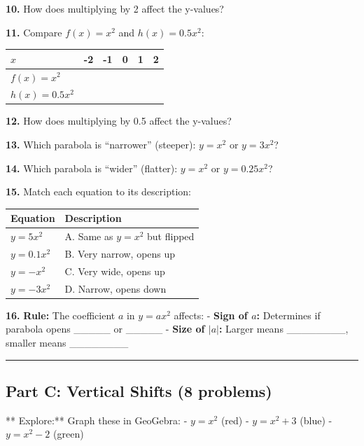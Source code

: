 \documentclass[
  11pt,
]{article}
\begin{document}
\textbf{10.} How does multiplying by 2 affect the y-values?

\textbf{11.} Compare \(f(x) = x^2\) and \(h(x) = 0.5x^2\):

\begin{longtable}[]{@{}llllll@{}}
\toprule\noalign{}
\(x\) & -2 & -1 & 0 & 1 & 2 \\
\midrule\noalign{}
\endhead
\bottomrule\noalign{}
\endlastfoot
\(f(x) = x^2\) & & & & & \\
\(h(x) = 0.5x^2\) & & & & & \\
\end{longtable}

\textbf{12.} How does multiplying by 0.5 affect the y-values?

\textbf{13.} Which parabola is ``narrower'' (steeper): \(y = x^2\) or
\(y = 3x^2\)?

\textbf{14.} Which parabola is ``wider'' (flatter): \(y = x^2\) or
\(y = 0.25x^2\)?

\textbf{15.} Match each equation to its description:

\begin{longtable}[]{@{}ll@{}}
\toprule\noalign{}
Equation & Description \\
\midrule\noalign{}
\endhead
\bottomrule\noalign{}
\endlastfoot
\(y = 5x^2\) & A. Same as \(y = x^2\) but flipped \\
\(y = 0.1x^2\) & B. Very narrow, opens up \\
\(y = -x^2\) & C. Very wide, opens up \\
\(y = -3x^2\) & D. Narrow, opens down \\
\end{longtable}

\textbf{16.} \textbf{Rule:} The coefficient \(a\) in \(y = ax^2\)
affects: - \textbf{Sign of \(a\):} Determines if parabola opens
\_\_\_\_\_ or \_\_\_\_\_ - \textbf{Size of \(|a|\):} Larger means
\_\_\_\_\_\_\_\_, smaller means \_\_\_\_\_\_\_\_

\begin{center}\rule{0.5\linewidth}{0.5pt}\end{center}

\hypertarget{part-c-vertical-shifts-8-problems}{%
\subsection{Part C: Vertical Shifts (8
problems)}\label{part-c-vertical-shifts-8-problems}}

** Explore:** Graph these in GeoGebra: - \(y = x^2\) (red) -
\(y = x^2 + 3\) (blue) - \(y = x^2 - 2\) (green)
\end{document}
